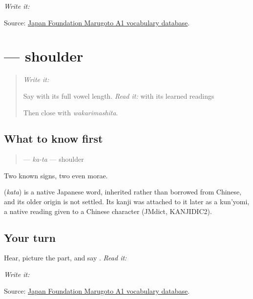 \emph{Write it:} \textbf{}

\begin{tcolorbox}[breakable,colback=teal!4,colframe=teal!35!black,title={Before you move on}]
Source: \href{https://words.marugotoweb.jp/}{Japan Foundation Marugoto A1 vocabulary database}.
\end{tcolorbox}
\section[\texorpdfstring{\ja{かた} (kata)}{かた (kata)}]{ — shoulder}

\label{lesson:JA-C12-kata}



\begin{quote}
\emph{Write it:} \textbf{}

Say \textbf{} with its full vowel length. \emph{Read it:} \textbf{} with its learned readings

Then close with \emph{wakarimashita}.
\end{quote}

\subsection*{What to know first}
\begin{quote}
\textbf{} — \emph{ka-ta} — shoulder
\end{quote}

Two known signs, two even morae.

\begin{cousinweb}
\textbf{} (\emph{kata}) is a native Japanese word, inherited rather than borrowed from Chinese, and its older origin is not settled. Its kanji was attached to it later as a kun'yomi, a native reading given to a Chinese character (JMdict, KANJIDIC2).
\end{cousinweb}

\subsection*{Your turn}
Hear, picture the part, and say \textbf{}. \emph{Read it:} \textbf{}

\emph{Write it:} \textbf{}

\begin{tcolorbox}[breakable,colback=teal!4,colframe=teal!35!black,title={Before you move on}]
Source: \href{https://words.marugotoweb.jp/}{Japan Foundation Marugoto A1 vocabulary database}.
\end{tcolorbox}
